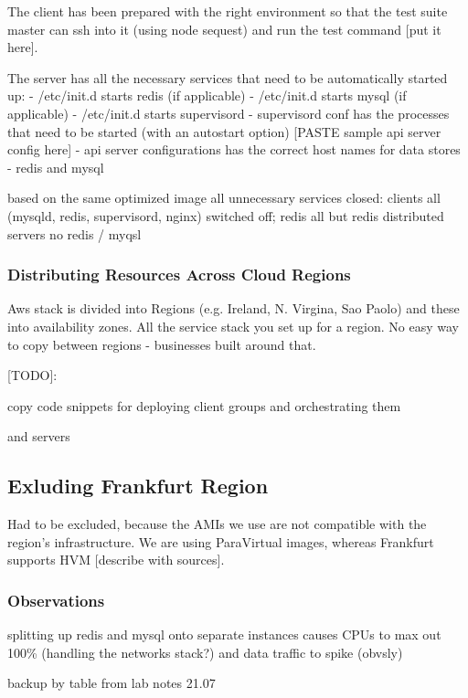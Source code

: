 \documentclass{uvamscse}
\begin{document}
The client has been prepared with the right environment so that the test suite master can ssh into it (using node sequest) and run the test command [put it here].

The server has all the necessary services that need to be automatically started up:
- /etc/init.d starts redis (if applicable)
- /etc/init.d starts mysql (if applicable)
- /etc/init.d starts supervisord
    - supervisord conf has the processes that need to be started (with an autostart option) [PASTE sample api server config here]
- api server configurations has the correct host names for data stores - redis and mysql

based on the same optimized image all unnecessary services closed: 
clients all (mysqld, redis, supervisord, nginx) switched off; redis all but redis 
distributed servers no redis / myqsl

\subsubsection{Distributing Resources Across Cloud Regions}

Aws stack is divided into Regions (e.g. Ireland, N. Virgina, Sao Paolo) and these into availability zones. All the service stack you set up for a region. No easy way to copy between regions - businesses built around that.

[TODO]:

copy code snippets for deploying client groups and orchestrating them 

and servers

\subsection{Exluding Frankfurt Region}\label{Exluding Frankfurt Region}

Had to be excluded, because the AMIs we use are not compatible with the region's infrastructure. We are using ParaVirtual images, whereas Frankfurt supports HVM [describe with sources].

\subsubsection{Observations}

splitting up redis and mysql onto separate instances causes CPUs to max out 100\% (handling the networks stack?) and data traffic to spike (obvsly)

backup by table from lab notes 21.07
\end{document}
